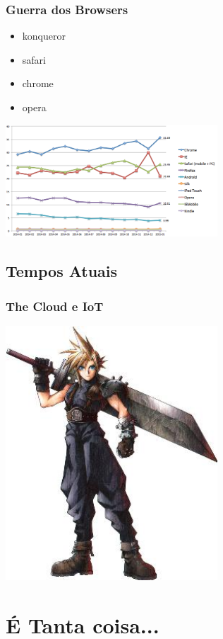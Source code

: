 \documentclass{beamer}
\begin{document}
\begin{frame} \frametitle{Guerra dos Browsers}
    \begin{itemize}
     \item konqueror
     \item safari
     \item chrome
     \item opera
    \end{itemize}
\end{frame}

\begin{frame}
    \includegraphics[width=300px]{images/browser-usage}
\end{frame}

\subsection { Tempos Atuais }

\begin{frame} \frametitle{The Cloud e IoT}
    \includegraphics[width=300px]{images/cloud-striffe}
\end{frame}

\section { É Tanta coisa... }
\end{document}
